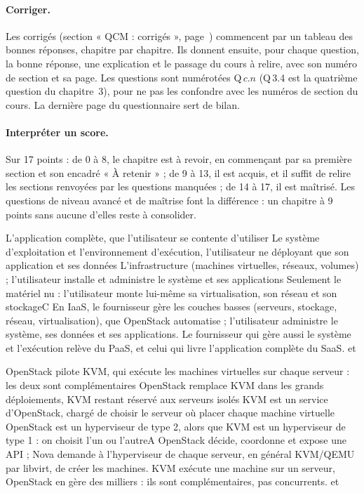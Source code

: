 \paragraph{Corriger.} Les corrigés (section « QCM : corrigés », page~\pageref{qcm:corr}) commencent par un tableau des bonnes
réponses, chapitre par chapitre. Ils donnent ensuite, pour chaque question, la bonne réponse, une explication et le passage du cours
à relire, avec son numéro de section et sa page. Les questions sont numérotées Q\,$c$.$n$ (Q\,3.4 est la quatrième question du chapitre~3), pour
ne pas les confondre avec les numéros de section du cours. La dernière page du questionnaire sert de bilan.

\paragraph{Interpréter un score.} Sur 17 points : de 0 à 8, le chapitre est à revoir, en commençant par sa première section et son
encadré « À retenir » ; de 9 à 13, il est acquis, et il suffit de relire les sections renvoyées par les questions manquées ; de 14 à 17,
il est maîtrisé. Les questions de niveau avancé et de maîtrise font la différence : un chapitre à 9 points sans aucune d'elles reste à consolider.


  {L'application complète, que l'utilisateur se contente d'utiliser}
  {Le système d'exploitation et l'environnement d'exécution, l'utilisateur ne déployant que son application et ses données}
  {L'infrastructure (machines virtuelles, réseaux, volumes) ; l'utilisateur installe et administre le système et ses applications}
  {Seulement le matériel nu : l'utilisateur monte lui-même sa virtualisation, son réseau et son stockage}{C}
  {En IaaS, le fournisseur gère les couches basses (serveurs, stockage, réseau, virtualisation), que OpenStack automatise ; l'utilisateur administre le système, ses données et ses applications. Le fournisseur qui gère aussi le système et l'exécution relève du PaaS, et celui qui livre l'application complète du SaaS.}
  { et }

  {OpenStack pilote KVM, qui exécute les machines virtuelles sur chaque serveur : les deux sont complémentaires}
  {OpenStack remplace KVM dans les grands déploiements, KVM restant réservé aux serveurs isolés}
  {KVM est un service d'OpenStack, chargé de choisir le serveur où placer chaque machine virtuelle}
  {OpenStack est un hyperviseur de type 2, alors que KVM est un hyperviseur de type 1 : on choisit l'un ou l'autre}{A}
  {OpenStack décide, coordonne et expose une API ; Nova demande à l'hyperviseur de chaque serveur, en général KVM/QEMU par libvirt, de créer les machines. KVM exécute une machine sur un serveur, OpenStack en gère des milliers : ils sont complémentaires, pas concurrents.}
  { et }

